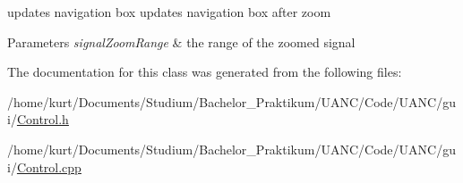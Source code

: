updates navigation box updates navigation box after zoom 


\begin{DoxyParams}{Parameters}
{\em signal\+Zoom\+Range} & the range of the zoomed signal \\
\hline
\end{DoxyParams}


The documentation for this class was generated from the following files\+:\begin{DoxyCompactItemize}
\item 
/home/kurt/\+Documents/\+Studium/\+Bachelor\+\_\+\+Praktikum/\+U\+A\+N\+C/\+Code/\+U\+A\+N\+C/gui/\hyperlink{_control_8h}{Control.\+h}\item 
/home/kurt/\+Documents/\+Studium/\+Bachelor\+\_\+\+Praktikum/\+U\+A\+N\+C/\+Code/\+U\+A\+N\+C/gui/\hyperlink{_control_8cpp}{Control.\+cpp}\end{DoxyCompactItemize}
